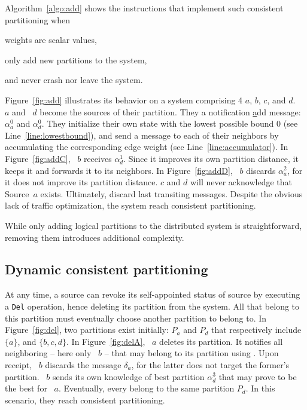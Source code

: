 Algorithm~\ref{algo:add} shows the instructions that implement such
consistent partitioning when
\begin{inparaenum}[(i)]
\item weights are scalar values,
\item \processes only add new partitions to the system,
\item and \processes never crash nor leave the system.
\end{inparaenum}
Figure~\ref{fig:add} illustrates its behavior on a system comprising 4
\processes $a$, $b$, $c$, and $d$. \Process~$a$ and \Process~$d$
become the sources of their partition. They \NAMEB a notification
\underline{a}dd message: $\alpha_a^0$ and $\alpha_d^0$. They
initialize their own state with the lowest possible bound $0$ (see
Line~\ref{line:lowestbound}), and send a message to each of their
neighbors by accumulating the corresponding edge weight (see
Line~\ref{line:accumulator}). In Figure~\ref{fig:addC}, \Process~$b$
receives $\alpha_{d}^{1}$. Since it improves its own partition
distance, it keeps it and forwards it to its neighbors. In
Figure~\ref{fig:addD}, \Process~$b$ discards $\alpha_{a}^{2}$, for it
does not improve its partition distance. \Processes $c$ and $d$ will
never acknowledge that Source~$a$ exists. Ultimately, \processes
discard last transiting messages. Despite the obvious lack of traffic
optimization, the system reach consistent partitioning.

While only adding logical partitions to the distributed system is
straightforward, removing them introduces additional complexity.

\subsection{Dynamic consistent partitioning}
\label{subsec:dynamic}


At any time, a source can revoke its self-appointed status of source
by executing a \texttt{Del} operation, hence deleting its partition
from the system. All \processes that belong to this partition must
eventually choose another partition to belong to. In
Figure~\ref{fig:del}, two partitions exist initially: $P_a$ and $P_d$
that respectively include $\{a\}$, and $\{b, c, d\}$. In
Figure~\ref{fig:delA}, \Process~$a$ deletes its partition. It notifies
all neighboring \processes -- here only \Process~$b$ -- that may
belong to its partition using \NAMEB. Upon receipt, \Process~$b$
discards the message $\delta_a$, for the latter does not target the
former's partition. \Process~$b$ sends its own knowledge of best
partition $\alpha_d^3$ that may prove to be the best for
\Process~$a$. Eventually, every \processes belong to the same
partition $P_d$. In this scenario, they reach consistent partitioning.

